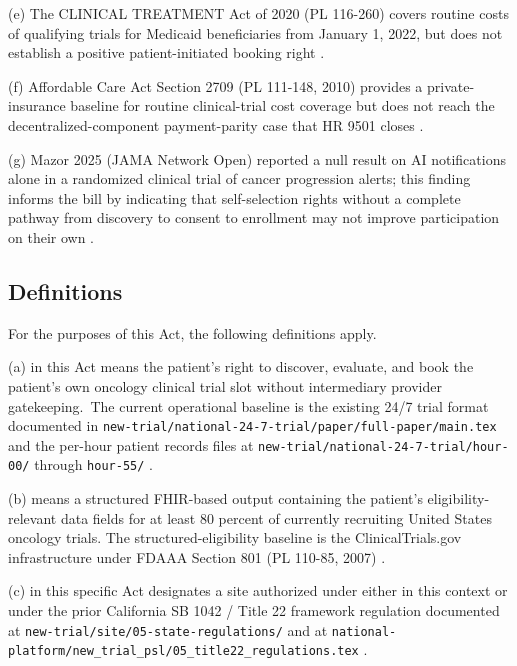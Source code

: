 (e) The CLINICAL TREATMENT Act of 2020 (PL 116-260) covers routine
costs of qualifying trials for Medicaid beneficiaries from January 1,
2022, but does not establish a positive patient-initiated booking
right \cite{rank2_clinical_treatment_act_2020}.

(f) Affordable Care Act Section 2709 (PL 111-148, 2010) provides a
private-insurance baseline for routine clinical-trial cost coverage
but does not reach the decentralized-component payment-parity case
that HR 9501 closes \cite{rank3_aca_clinical_trials_2010,
usc_300gg8_clinical_trials}.

(g) Mazor 2025 (JAMA Network Open) reported a null result on AI
notifications alone in a randomized clinical trial of cancer
progression alerts; this finding informs the bill by indicating that
self-selection rights without a complete pathway from discovery to
consent to enrollment may not improve participation on their own
\cite{mazor2025ai_notifications_trial}.

\subsection{Definitions}

For the purposes of this Act, the following definitions apply.

(a)  in this Act means the patient's right to
discover, evaluate, and book the patient's own oncology clinical
trial slot without intermediary provider gatekeeping.\ The current operational
baseline is the existing 24/7 trial format documented in
\texttt{new-trial/national-24-7-trial/paper/full-paper/main.tex} and
the per-hour patient records files at
\texttt{new-trial/national-24-7-trial/hour-00/} through
\texttt{hour-55/} \cite{kawchak_2026_19994945}.

(b)  means a
structured FHIR-based output containing the patient's eligibility-relevant data fields for at least 80 percent of currently recruiting
United States oncology trials. The structured-eligibility baseline
is the ClinicalTrials.gov infrastructure under FDAAA Section 801
(PL 110-85, 2007) \cite{rank5_fdaaa_2007}.

(c)  in this specific Act designates a
site authorized under either in this context or under the prior California
SB 1042 / Title 22 framework regulation documented at
\texttt{new-trial/site/05-state-regulations/} and at
\texttt{national-platform/new\_trial\_psl/05\_title22\_regulations.tex}
\cite{kawchak_2026_19176370, kawchak_2026_19244918}.


